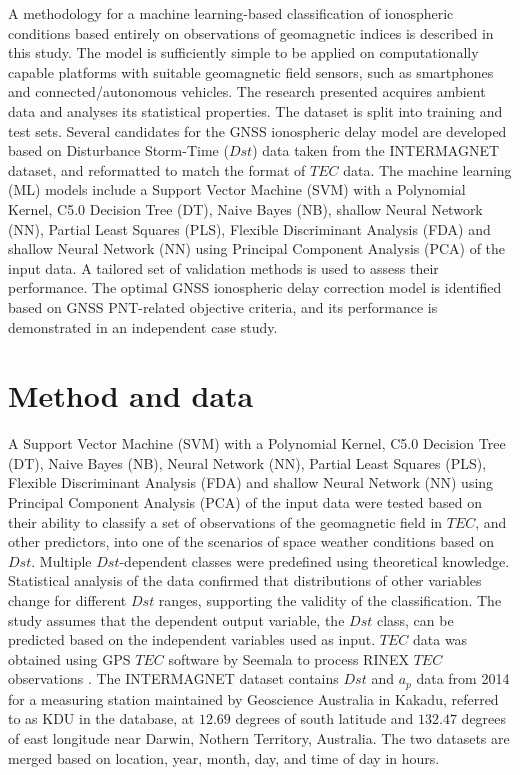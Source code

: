 \let\LaTeXcline\cline\documentclass[sn-mathphys-num]{sn-jnl}\let\cline\LaTeXcline
\begin{document}
A methodology for a machine learning-based classification of ionospheric conditions based entirely on observations of geomagnetic indices is described in this study. The model is sufficiently simple to be applied on computationally capable platforms with suitable geomagnetic field sensors, such as smartphones and connected/autonomous vehicles. The research presented acquires ambient data and analyses its statistical properties. The dataset is split into training and test sets. Several candidates for the GNSS ionospheric delay model are developed based on Disturbance Storm-Time ($Dst$) data taken from the INTERMAGNET \cite{Intermagnet2022-cj} dataset, and reformatted to match the format of $TEC$ data. The machine learning (ML) models include a Support Vector Machine (SVM) with a Polynomial Kernel, C5.0 Decision Tree (DT), Naive Bayes (NB), shallow Neural Network (NN), Partial Least Squares (PLS), Flexible Discriminant Analysis (FDA) and shallow Neural Network (NN) using Principal Component Analysis (PCA) of the input data. A tailored set of validation methods is used to assess their performance. The optimal GNSS ionospheric delay correction model is identified based on GNSS PNT-related objective criteria, and its performance is demonstrated in an independent case study.

\section{Method and data}
\label{sec:Dataset}

A Support Vector Machine (SVM) with a Polynomial Kernel, C5.0 Decision Tree (DT), Naive Bayes (NB), Neural Network (NN), Partial Least Squares (PLS), Flexible Discriminant Analysis (FDA) and shallow Neural Network (NN) using Principal Component Analysis (PCA) of the input data were tested based on their ability to classify a set of observations of the geomagnetic field in $TEC$, and other predictors, into one of the scenarios of space weather conditions based on $Dst$. Multiple $Dst$-dependent classes were predefined using theoretical knowledge. Statistical analysis of the data confirmed that distributions of other variables change for different $Dst$ ranges, supporting the validity of the classification. The study assumes that the dependent output variable, the $Dst$ class, can be predicted based on the independent variables used as input. $TEC$ data was obtained using GPS $TEC$ software by Seemala to process RINEX $TEC$ observations \cite{SEEMALA202363}. The INTERMAGNET \cite{Intermagnet2022-cj} dataset contains $Dst$ and $a_{p}$ data from 2014 for a measuring station maintained by Geoscience Australia in Kakadu, referred to as KDU in the database, at $12.69$ degrees of south latitude and $132.47$ degrees of east longitude near Darwin, Nothern Territory, Australia. The two datasets are merged based on location, year, month, day, and time of day in hours.
\end{document}
